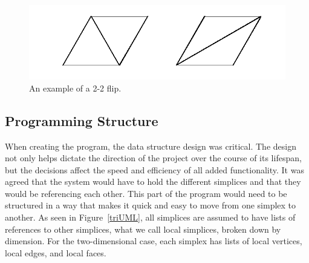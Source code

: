 \documentclass[12pt]{article}
\begin{document}
\begin{figure}
\centering
\includegraphics[scale = 0.8]{Pictures/Flip.png}
\caption{An example of a 2-2 flip.}
\label{fig:flip}
\end{figure}

\subsection{Programming Structure}

\noindent When creating the program, the data structure design was critical. The design not only helps dictate the direction of the project over the course of its lifespan, but the decisions affect the speed and efficiency of all added functionality. It was agreed that the system would have to hold the different simplices and that they would be referencing each other. This part of the program would need to be structured in a way that makes it quick and easy to move from one simplex to another. As seen in Figure~\ref{triUML}, all simplices are assumed to have lists of references to other simplices, what we call local simplices, broken down by dimension. For the two-dimensional case, each simplex has lists of local vertices, local edges, and local faces.\newline
\end{document}
